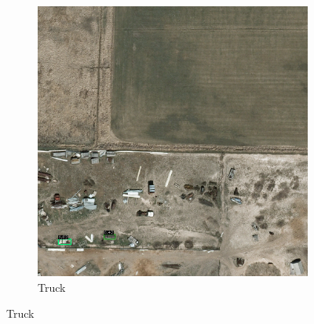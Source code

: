 \begin{figure}[h!]
\begin{subfigure}[t]{0.38\textwidth}
        \includegraphics[width=\linewidth]{images/015Results/01abb_vs_obb/comp_images/abb/212.png}
        \caption{Truck}
    \end{subfigure}
    

\end{figure}
